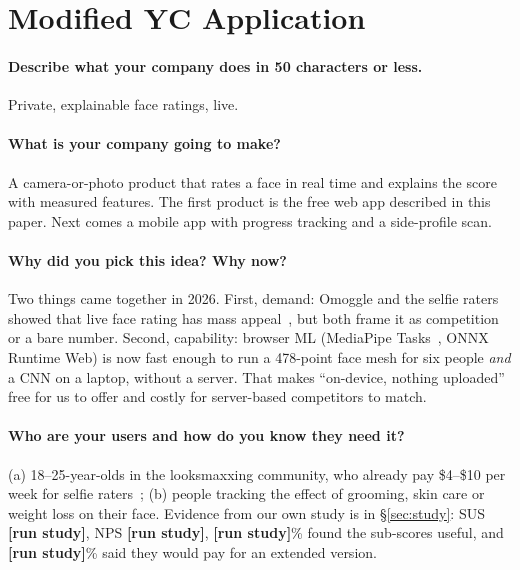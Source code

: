 \documentclass[sigconf,nonacm]{acmart}
\newcommand{\pending}[1]{\textcolor{todo}{\textbf{[#1]}}}
\newcommand{\studyval}[1]{\ifdefined\studyPending\pending{run study}\else#1\fi}
\begin{document}
\section{Modified YC Application}
\label{sec:yc}

\paragraph{Describe what your company does in 50 characters or less.}
Private, explainable face ratings, live.

\paragraph{What is your company going to make?}
A camera-or-photo product that rates a face in real time and explains the score with \nFeatures{} measured
features. The first product is the free web app described in this paper. Next comes a mobile app with
progress tracking and a side-profile scan.

\paragraph{Why did you pick this idea? Why now?}
Two things came together in 2026. First, demand: Omoggle and the selfie raters showed that live face rating has mass
appeal~\cite{dexerto2026omoggle,plisio2026looksmax}, but both frame it as competition or a bare number. Second, capability: browser ML
(MediaPipe Tasks~\cite{kartynnik2019facemesh}, ONNX Runtime Web) is now fast enough to run a 478-point face
mesh for six people \emph{and} a CNN on a laptop, without a server. That makes ``on-device, nothing
uploaded'' free for us to offer and costly for server-based competitors to match.

\paragraph{Who are your users and how do you know they need it?}
(a) 18--25-year-olds in the looksmaxxing community, who already pay \$4--\$10 per week for selfie
raters~\cite{hyscaler2026looksmax,appstore2026looksmaxpsl}; (b) people tracking the effect of grooming,
skin care or weight loss on their face. Evidence from our own study is in \S\ref{sec:study}:
SUS \studyval{\susMean}, NPS \studyval{\npsScore}, \studyval{\agreePillars}\% found the sub-scores useful,
and \studyval{\payPct}\% said they would pay for an extended version.
\end{document}
